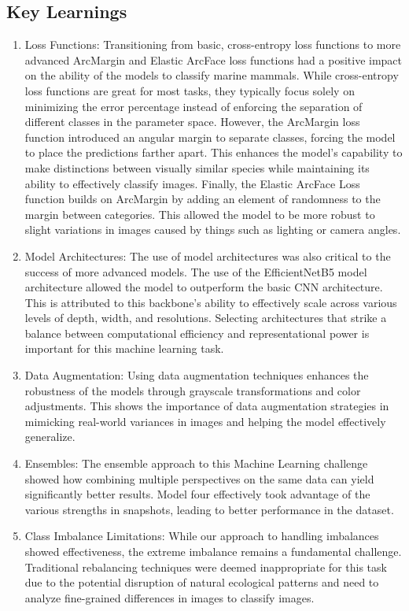 \documentclass[twocolumn]{article}
\begin{document}
\subsection{Key Learnings}

\begin{enumerate}
    \item Loss Functions: Transitioning from basic, cross-entropy loss functions to more advanced ArcMargin and Elastic ArcFace loss functions had a positive impact on the ability of the models to classify marine mammals. While cross-entropy loss functions are great for most tasks, they typically focus solely on minimizing the error percentage instead of enforcing the separation of different classes in the parameter space. However, the ArcMargin loss function introduced an angular margin to separate classes, forcing the model to place the predictions farther apart. This enhances the model's capability to make distinctions between visually similar species while maintaining its ability to effectively classify images. Finally, the Elastic ArcFace Loss function builds on ArcMargin by adding an element of randomness to the margin between categories. This allowed the model to be more robust to slight variations in images caused by things such as lighting or camera angles. 
    \item Model Architectures: The use of model architectures was also critical to the success of more advanced models. The use of the EfficientNetB5 model architecture allowed the model to outperform the basic CNN architecture. This is attributed to this backbone's ability to effectively scale across various levels of depth, width, and resolutions. Selecting architectures that strike a balance between computational efficiency and representational power is important for this machine learning task.
    \item Data Augmentation: Using data augmentation techniques enhances the robustness of the models through grayscale transformations and color adjustments. This shows the importance of data augmentation strategies in mimicking real-world variances in images and helping the model effectively generalize. 
    \item Ensembles: The ensemble approach to this Machine Learning challenge showed how combining multiple perspectives on the same data can yield significantly better results. Model four effectively took advantage of the various strengths in snapshots, leading to better performance in the dataset.
    \item Class Imbalance Limitations: While our approach to handling imbalances showed effectiveness, the extreme imbalance remains a fundamental challenge. Traditional rebalancing techniques were deemed inappropriate for this task due to the potential disruption of natural ecological patterns and need to analyze fine-grained differences in images to classify images. 

\end{enumerate}
\end{document}

